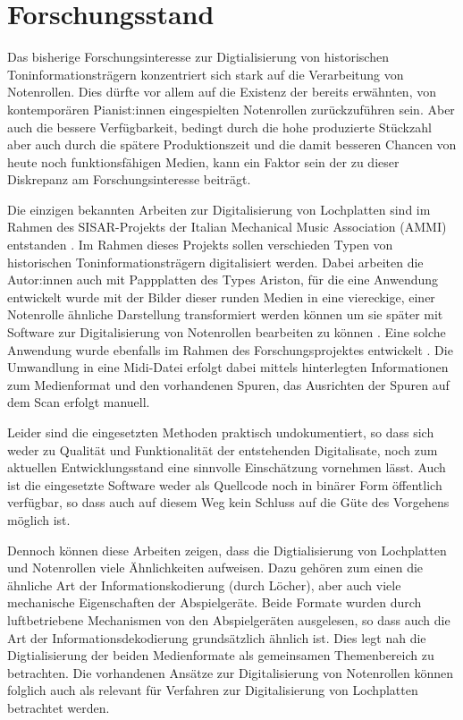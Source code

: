 \section{Forschungsstand} \label{Forschungsstand}

Das bisherige Forschungsinteresse zur Digtialisierung von historischen Toninformationsträgern konzentriert sich stark auf die Verarbeitung von Notenrollen.
Dies dürfte vor allem auf die Existenz der bereits erwähnten, von kontemporären Pianist:innen eingespielten Notenrollen zurückzuführen sein.
Aber auch die bessere Verfügbarkeit, bedingt durch die hohe produzierte Stückzahl aber auch durch die spätere Produktionszeit und die damit besseren Chancen von heute noch funktionsfähigen Medien, kann ein Faktor sein der zu dieser Diskrepanz am Forschungsinteresse beiträgt.

Die einzigen bekannten Arbeiten zur Digitalisierung von Lochplatten sind im Rahmen des SISAR-Projekts der Italian Mechanical Music Association (AMMI) entstanden \parencite[]{pedrazzini_2013,perretti_2014}.
Im Rahmen dieses Projekts sollen verschieden Typen von historischen Toninformationsträgern digitalisiert werden.
Dabei arbeiten die Autor:innen auch mit Pappplatten des Types Ariston, für die eine Anwendung entwickelt wurde mit der Bilder dieser runden Medien in eine viereckige, einer Notenrolle ähnliche Darstellung transformiert werden können um sie später mit Software zur Digitalisierung von Notenrollen bearbeiten zu können \parencite[]{perretti_2014}.
Eine solche Anwendung wurde ebenfalls im Rahmen des Forschungsprojektes entwickelt \parencite[]{conversion}.
Die Umwandlung in eine Midi-Datei erfolgt dabei mittels hinterlegten Informationen zum Medienformat und den vorhandenen Spuren, das Ausrichten der Spuren auf dem Scan erfolgt manuell.

Leider sind die eingesetzten Methoden praktisch undokumentiert, so dass sich weder zu Qualität und Funktionalität der entstehenden Digitalisate, noch zum aktuellen Entwicklungsstand eine sinnvolle Einschätzung vornehmen lässt.
Auch ist die eingesetzte Software weder als Quellcode noch in binärer Form öffentlich verfügbar, so dass auch auf diesem Weg kein Schluss auf die Güte des Vorgehens möglich ist.

Dennoch können diese Arbeiten zeigen, dass die Digtialisierung von Lochplatten und Notenrollen viele Ähnlichkeiten aufweisen.
Dazu gehören zum einen die ähnliche Art der Informationskodierung (durch Löcher), aber auch viele mechanische Eigenschaften der Abspielgeräte.
Beide Formate wurden durch luftbetriebene Mechanismen von den Abspielgeräten ausgelesen, so dass auch die Art der Informationsdekodierung grundsätzlich ähnlich ist.
Dies legt nah die Digtialisierung der beiden Medienformate als gemeinsamen Themenbereich zu betrachten.
Die vorhandenen Ansätze zur Digitalisierung von Notenrollen können folglich auch als relevant für Verfahren zur Digitalisierung von Lochplatten betrachtet werden.

